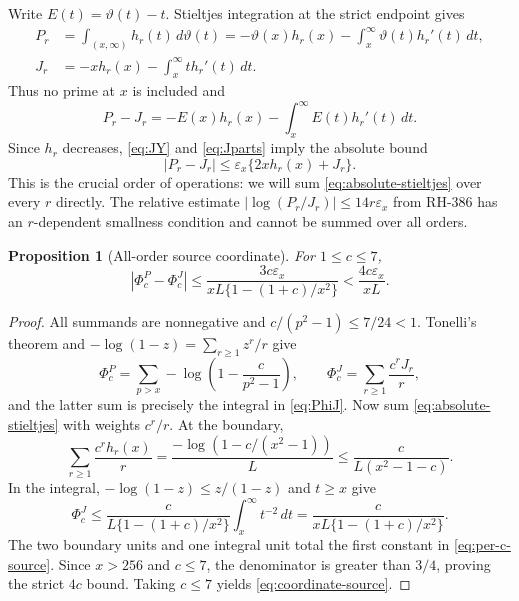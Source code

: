 \documentclass[11pt]{article}
\newtheorem{proposition}[theorem]{Proposition}
\theoremstyle{definition}
\theoremstyle{remark}
\newcommand{\eps}{\varepsilon}
\newcommand{\PhiP}{\Phi^{P}}
\newcommand{\PhiJ}{\Phi^{J}}
\begin{document}
Write $E(t)=\vartheta(t)-t$.  Stieltjes integration at the strict endpoint
gives
\begin{align}
 P_r&=\int_{(x,\infty)}h_r(t)\,d\vartheta(t)
 =-\vartheta(x)h_r(x)-\int_x^\infty\vartheta(t)h_r'(t)\,dt,
 \label{eq:stieltjes}\\
 J_r&=-xh_r(x)-\int_x^\infty t h_r'(t)\,dt.\label{eq:Jparts}
\end{align}
Thus no prime at $x$ is included and
\begin{equation}
 P_r-J_r=-E(x)h_r(x)-\int_x^\infty E(t)h_r'(t)\,dt.
 \label{eq:error-identity}
\end{equation}
Since $h_r$ decreases, \eqref{eq:JY} and \eqref{eq:Jparts} imply the
absolute bound
\begin{equation}
 |P_r-J_r|\le\eps_x\{2xh_r(x)+J_r\}.
 \label{eq:absolute-stieltjes}
\end{equation}
This is the crucial order of operations: we will sum
\eqref{eq:absolute-stieltjes} over every $r$ directly.  The relative
estimate $|\log(P_r/J_r)|\le14r\eps_x$ from RH-386 has an $r$-dependent
smallness condition and cannot be summed over all orders.

\begin{proposition}[All-order source coordinate]
\label{prop:source}
For $1\le c\le7$,
\begin{equation}
 |\PhiP_c-\PhiJ_c|
 \le \frac{3c\eps_x}{ xL\{1-(1+c)/x^2\}}
 <\frac{4c\eps_x}{ xL}.
 \label{eq:per-c-source}
\end{equation}
\end{proposition}

\begin{proof}
All summands are nonnegative and $c/(p^2-1)\le7/24<1$.  Tonelli's
theorem and $-\log(1-z)=\sum_{r\ge1}z^r/r$ give
\begin{equation}
 \PhiP_c=\sum_{p>x}-\log\!\left(1-\frac{c}{ p^2-1}\right),
 \qquad
 \PhiJ_c=\sum_{r\ge1}\frac{c^rJ_r}{ r},
 \label{eq:tonelli}
\end{equation}
and the latter sum is precisely the integral in \eqref{eq:PhiJ}.  Now sum
\eqref{eq:absolute-stieltjes} with weights $c^r/r$.  At the boundary,
\[
 \sum_{r\ge1}\frac{c^rh_r(x)}{ r}
 =\frac{ -\log(1-c/(x^2-1))}{ L}
 \le \frac{c}{ L(x^2-1-c)}.
\]
In the integral, $-\log(1-z)\le z/(1-z)$ and $t\ge x$ give
\[
 \PhiJ_c\le \frac{c}{ L\{1-(1+c)/x^2\}}
 \int_x^\infty t^{-2}\,dt
 =\frac{c}{ xL\{1-(1+c)/x^2\}}.
\]
The two boundary units and one integral unit total the first constant in
\eqref{eq:per-c-source}.  Since $x>256$ and $c\le7$, the denominator is
greater than $3/4$, proving the strict $4c$ bound.  Taking $c\le7$ yields
\eqref{eq:coordinate-source}.
\end{proof}
\end{document}
